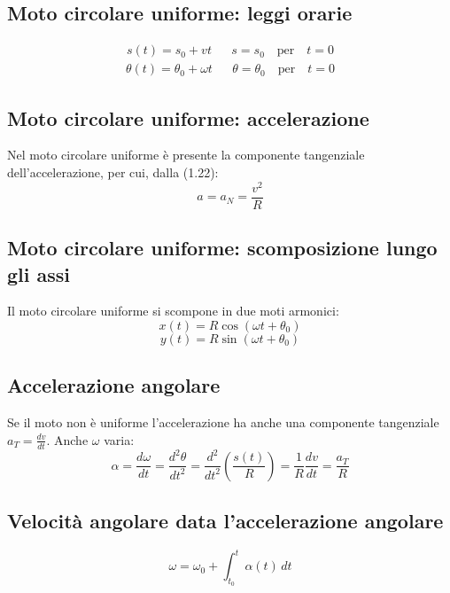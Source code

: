 \documentclass{report}
\begin{document}
\subsection{Moto circolare uniforme: leggi orarie}
\begin{align*}
    s(t) = s_0 + vt && s = s_0 \quad\text{per}\quad t = 0 
\end{align*}
\begin{align*}
    \theta(t) = \theta_0 + \omega t && \theta = \theta_0 \quad\text{per}\quad t = 0
\end{align*}

\subsection{Moto circolare uniforme: accelerazione}
Nel moto circolare uniforme è presente la componente tangenziale \\dell'accelerazione,
per cui, dalla (1.22):
\begin{equation}
    a = a_N = \frac{v^2}{R}
\end{equation}

\subsection{Moto circolare uniforme: scomposizione lungo gli assi}
Il moto circolare uniforme si scompone in due moti armonici:
\begin{equation*}
    x(t) = R\cos(\omega t + \theta_0)
\end{equation*}
\begin{equation*}
    y(t) = R\sin(\omega t + \theta_0)
\end{equation*}

\subsection{Accelerazione angolare}
Se il moto non è uniforme l'accelerazione ha anche una componente tangenziale 
\(a_T = \frac{dv}{dt}\). Anche \(\omega\) varia:
\begin{equation}
    \alpha = \frac{d\omega}{dt} = \frac{d^2\theta}{dt^2} 
    = \frac{d^2}{dt^2}\left(\frac{s(t)}{R}\right)
    = \frac{1}{R}\frac{dv}{dt} = \frac{a_T}{R}
\end{equation}

\subsection{Velocità angolare data l'accelerazione angolare}
\begin{equation}
    \omega = \omega_0 + \int_{t_0}^{t}\alpha(t)\,dt
\end{equation}
\end{document}
